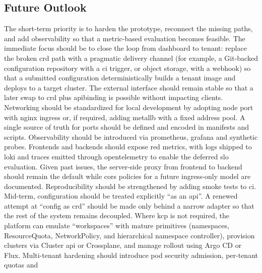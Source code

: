 \documentclass[11pt, a4paper, oneside, listof=totoc]{scrartcl}
\begin{document}
        \subsection{Future Outlook}\label{subsec:outlook}
            The short-term priority is to harden the prototype, reconnect the missing paths, and add
            observability so that a metric-based evaluation becomes feasible.
            The immediate focus should be to close the loop from dashboard to tenant: replace the
            broken \gls{crd} path with a pragmatic delivery channel (for example, a Git-backed
            configuration repository with a \gls{ci} trigger, or object storage, with a webhook) so
            that a submitted configuration deterministically builds a tenant image and deploys to a
            target cluster.
            The external interface should remain stable so that a later swap to \gls{crd} plus
            \gls{apibinding} is possible without impacting clients.
            Networking should be standardized for local development by adopting node port with nginx
            \gls{ingress} or, if required, adding \gls{metallb} with a fixed address pool.
            A single source of truth for ports should be defined and encoded in manifests and
            scripts.
            Observability should be introduced via \gls{prometheus}, \gls{grafana} and synthetic probes.
            Frontends and backends should expose \gls{red} metrics, with logs shipped to \gls{loki} and
            traces emitted through \gls{opentelemetry} to enable the deferred \gls{slo} evaluation.
            Given past issues, the server-side proxy from frontend to backend should remain the
            default while \gls{cors} policies for a future \gls{ingress}-only model are documented.
            Reproducibility should be strengthened by adding smoke tests to \gls{ci}.\\
            Mid-term, configuration should be treated explicitly \enquote{as an \gls{api}}.
            A renewed attempt at \enquote{config as \gls{crd}} should be made only behind a narrow
            adapter so that the rest of the system remains decoupled.
            Where \gls{kcp} is not required, the platform can emulate \enquote{workspaces} with
            mature primitives (namespaces, ResourceQuota, NetworkPolicy, and hierarchical namespace
            controller), provision clusters via Cluster \gls{api} or Crossplane, and manage rollout
            using Argo CD or Flux.
            Multi-tenant hardening should introduce pod security admission, per-tenant quotas and
\end{document}
